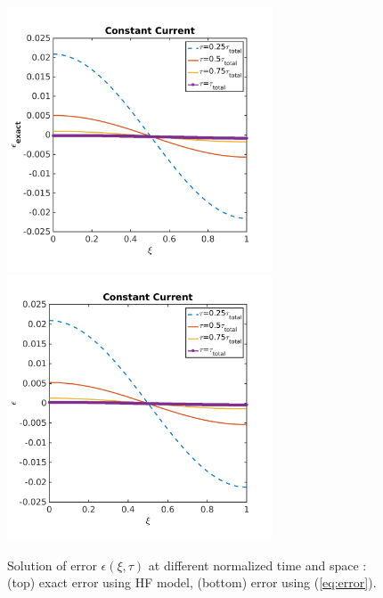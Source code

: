 \documentclass[]{article}
\begin{document}
\begin{figure}[h]
    \centering
    \includegraphics[trim = 0in 0in 0in 0in, clip, width=0.7\textwidth]{figures/error2d_exact.png}
    \\
    \includegraphics[trim = 0in 0in 0in 0in, clip, width=0.7\textwidth]{figures/error2d.png}      
    \caption{Solution of error $\epsilon(\xi,\tau)$ at different normalized time and space : (top) exact error using HF model, (bottom) error using (\ref{eq:error}).}
    \label{fig:error_2d}
\end{figure}
\end{document}
